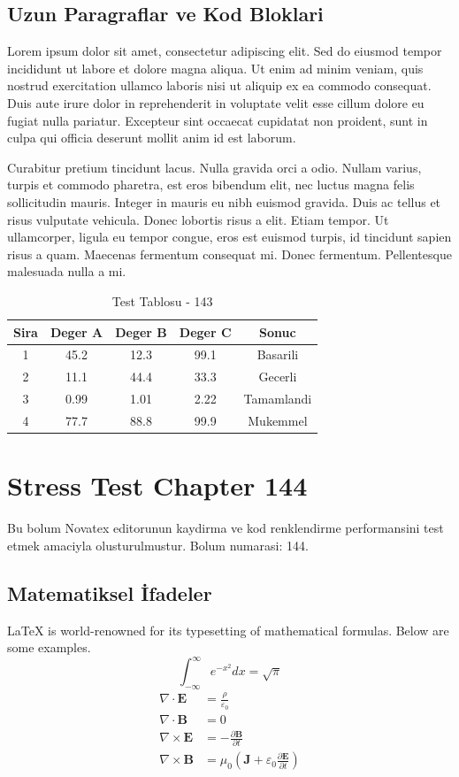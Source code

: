 \documentclass[12pt,a4paper]{article}
\begin{document}
\subsection{Uzun Paragraflar ve Kod Bloklari}
Lorem ipsum dolor sit amet, consectetur adipiscing elit. Sed do eiusmod tempor incididunt ut labore et dolore magna aliqua. Ut enim ad minim veniam, quis nostrud exercitation ullamco laboris nisi ut aliquip ex ea commodo consequat. Duis aute irure dolor in reprehenderit in voluptate velit esse cillum dolore eu fugiat nulla pariatur. Excepteur sint occaecat cupidatat non proident, sunt in culpa qui officia deserunt mollit anim id est laborum.

Curabitur pretium tincidunt lacus. Nulla gravida orci a odio. Nullam varius, turpis et commodo pharetra, est eros bibendum elit, nec luctus magna felis sollicitudin mauris. Integer in mauris eu nibh euismod gravida. Duis ac tellus et risus vulputate vehicula. Donec lobortis risus a elit. Etiam tempor. Ut ullamcorper, ligula eu tempor congue, eros est euismod turpis, id tincidunt sapien risus a quam. Maecenas fermentum consequat mi. Donec fermentum. Pellentesque malesuada nulla a mi.

\begin{table}[h!]
\centering
\begin{tabular}{|c|c|c|c|c|}
\hline
\textbf{Sira} & \textbf{Deger A} & \textbf{Deger B} & \textbf{Deger C} & \textbf{Sonuc} \\
\hline
1 & 45.2 & 12.3 & 99.1 & Basarili \\
2 & 11.1 & 44.4 & 33.3 & Gecerli \\
3 & 0.99 & 1.01 & 2.22 & Tamamlandi \\
4 & 77.7 & 88.8 & 99.9 & Mukemmel \\
\hline
\end{tabular}
\caption{Test Tablosu - 143}
\end{table}

\newpage
\section{Stress Test Chapter 144}
Bu bolum Novatex editorunun kaydirma ve kod renklendirme performansini test etmek amaciyla olusturulmustur. Bolum numarasi: 144.

\subsection{Matematiksel İfadeler}
\LaTeX{} is world-renowned for its typesetting of mathematical formulas. Below are some examples.
\begin{equation}
\int_{-\infty}^{\infty} e^{-x^2} dx = \sqrt{\pi}
\end{equation}
\begin{align}
\nabla \cdot \mathbf{E} &= \frac{\rho}{\varepsilon_0} \\
\nabla \cdot \mathbf{B} &= 0 \\
\nabla \times \mathbf{E} &= -\frac{\partial \mathbf{B}}{\partial t} \\
\nabla \times \mathbf{B} &= \mu_0\left(\mathbf{J} + \varepsilon_0 \frac{\partial \mathbf{E}}{\partial t}\right)
\end{align}
\end{document}
